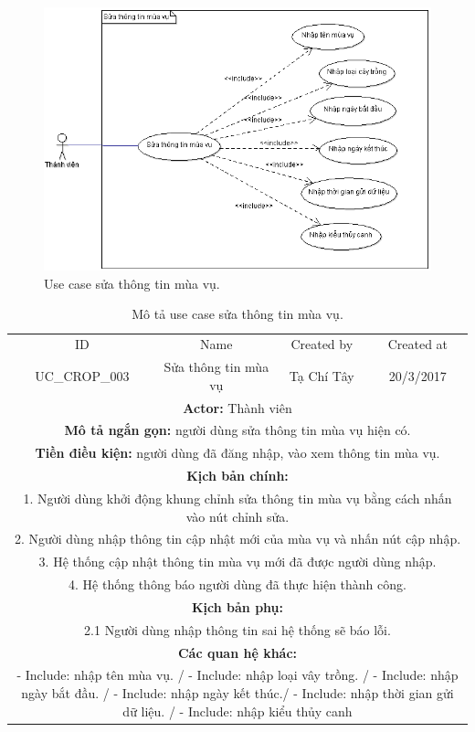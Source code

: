 \documentclass[a4paper,12pt,oneside]{article}
\begin{document}
\begin{figure}[htp]
\centering
\includegraphics[scale=.8]{hinh/sttmv.png}
\caption{Use case sửa thông tin mùa vụ.}
\end{figure}

\begin{table}[!htp]
\centering
\begin{tabularx}{\linewidth}{ |c||c|c|c| }
\hline
ID & Name & Created by & Created at\\
UC\_CROP\_003 & Sửa thông tin mùa vụ & Tạ Chí Tây & 20/3/2017\\
\hline
\multicolumn{4}{|X|}{\textbf{Actor:} Thành viên }\\
\hline
\multicolumn{4}{|X|}{\textbf{Mô tả ngắn gọn:} người dùng sửa thông tin mùa vụ hiện có. }\\
\hline
\multicolumn{4}{|X|}{\textbf{Tiền điều kiện:} người dùng đã đăng nhập, vào xem thông tin mùa vụ.}\\
\hline
\multicolumn{4}{|X|}{\textbf{Kịch bản chính:}}\\
\multicolumn{4}{|X|}{ 1.	Người dùng khởi động khung chỉnh sửa thông tin mùa vụ bằng cách nhấn vào nút chỉnh sửa.}\\
\multicolumn{4}{|X|}{
2.	Người dùng nhập thông tin cập nhật mới của mùa vụ và nhấn nút cập nhập.}\\
\multicolumn{4}{|X|}{
3.	Hệ thống cập nhật thông tin mùa vụ mới đã được người dùng nhập.}\\
\multicolumn{4}{|X|}{4. Hệ thống thông báo người dùng đã thực hiện thành công.}\\
\hline
\multicolumn{4}{|X|}{\textbf{Kịch bản phụ:}}\\
\multicolumn{4}{|X|}{2.1    Người dùng nhập thông tin sai hệ thống sẽ báo lỗi.}\\
\hline
\multicolumn{4}{|X|}{\textbf{Các quan hệ khác:}}\\
\multicolumn{4}{|X|}{- Include: nhập tên mùa vụ. / - Include: nhập loại vây trồng. / - Include: nhập ngày bắt đầu. / - Include: nhập ngày kết thúc./ - Include: nhập thời gian gửi dữ liệu. / - Include: nhập kiểu thủy canh}\\
\hline

\end{tabularx}
\caption{Mô tả use case sửa thông tin mùa vụ.}
\end{table}
\end{document}
